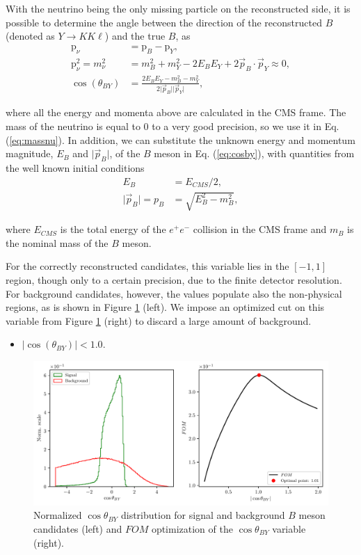 \documentclass[headings=standardclasses,headings=big,oneside,a4paper,openany,12pt]{scrbook}
\begin{document}
With the neutrino being the only missing particle on the reconstructed side, it is possible to determine the angle between the direction of the reconstructed $B$ (denoted as $Y \to K K \ell$) and the true $B$, as
\begin{align}
\mathrm{p}_\nu &= \mathrm{p}_B - \mathrm{p}_{Y}, \\
\label{eq:massnu}
\mathrm{p}_\nu^2 = m_\nu^2 &= m_B^2 + m_Y^2 - 2E_BE_Y + 2\vec{p}_B \cdot \vec{p}_Y \approx 0, \\ 
\label{eq:cosby}
\cos \left(\theta_{BY}\right) &= \frac{2E_BE_Y - m_B^2 - m_Y^2}{2\vert \vec{p}_B \vert \vert \vec{p}_Y\vert},
\end{align} 

where all the energy and momenta above are calculated in the CMS frame. The mass of the neutrino is equal to 0 to a very good precision, so we use it in Eq. (\ref{eq:massnu}). In addition, we can substitute the unknown energy and momentum magnitude, $E_B$ and $\vert \vec{p}_B \vert$, of the $B$ meson in Eq. (\ref{eq:cosby}), with quantities from the well known initial conditions
\begin{align}
E_B &= E_{CMS} / 2,\\
\vert \vec{p}_B \vert = p_B &= \sqrt{E_B^2 - m_B^2},
\end{align} 

where $E_{CMS}$ is the total energy of the $e^+e^-$ collision in the CMS frame and $m_B$ is the nominal mass of the $B$ meson. 

For the correctly reconstructed candidates, this variable lies in the $[-1,1]$ region, though only to a certain precision, due to the finite detector resolution. For background candidates, however, the values populate also the non-physical regions, as is shown in Figure \ref{fig:cosby} (left). We impose an optimized cut on this variable from Figure \ref{fig:cosby} (right) to discard a large amount of background.
\begin{itemize}
\item $\vert \cos \left(\theta_{BY}\right) \vert < 1.0$.
\end{itemize}

\begin{figure}[H]
\centering
\captionsetup{width=.8\linewidth}
\includegraphics[width=\linewidth]{fig/cosBY}
\caption{Normalized $\cos \theta_{BY}$ distribution for signal and background $B$ meson candidates (left) and $FOM$ optimization of the $\cos \theta_{BY}$ variable (right).}
\label{fig:cosby}
\end{figure}
\end{document}
